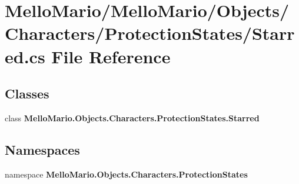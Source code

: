 \section{Mello\+Mario/\+Mello\+Mario/\+Objects/\+Characters/\+Protection\+States/\+Starred.cs File Reference}
\label{Starred_8cs}
\subsection*{Classes}
\begin{DoxyCompactItemize}
\item 
class \textbf{ Mello\+Mario.\+Objects.\+Characters.\+Protection\+States.\+Starred}
\end{DoxyCompactItemize}
\subsection*{Namespaces}
\begin{DoxyCompactItemize}
\item 
namespace \textbf{ Mello\+Mario.\+Objects.\+Characters.\+Protection\+States}
\end{DoxyCompactItemize}
